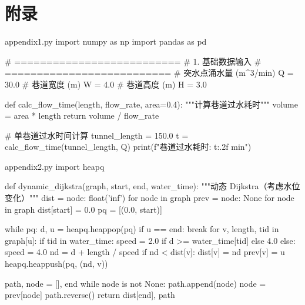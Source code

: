 \documentclass[withoutpreface,bwprint]{cumcmthesis}
\begin{document}
\section*{附录}
\begin{filecontents*}[overwrite]{appendix1.py}
import numpy as np
import pandas as pd

# ==========================
# 1. 基础数据输入
# ==========================
# 突水点涌水量 (m^3/min)
Q = 30.0
# 巷道宽度 (m)
W = 4.0
# 巷道高度 (m)
H = 3.0

def calc_flow_time(length, flow_rate, area=0.4):
    """计算巷道过水耗时"""
    volume = area * length
    return volume / flow_rate

# 单巷道过水时间计算
tunnel_length = 150.0
t = calc_flow_time(tunnel_length, Q)
print(f"巷道过水耗时: {t:.2f} min")
\end{filecontents*}
\begin{filecontents*}[overwrite]{appendix2.py}
import heapq

def dynamic_dijkstra(graph, start, end, water_time):
    """动态 Dijkstra（考虑水位变化）"""
    dist = {node: float('inf') for node in graph}
    prev = {node: None for node in graph}
    dist[start] = 0.0
    pq = [(0.0, start)]

    while pq:
        d, u = heapq.heappop(pq)
        if u == end:
            break
        for v, length, tid in graph[u]:
            if tid in water_time:
                speed = 2.0 if d >= water_time[tid] else 4.0
            else:
                speed = 4.0
            nd = d + length / speed
            if nd < dist[v]:
                dist[v] = nd
                prev[v] = u
                heapq.heappush(pq, (nd, v))

    path, node = [], end
    while node is not None:
        path.append(node)
        node = prev[node]
    path.reverse()
    return dist[end], path
\end{filecontents*}
\end{document}
